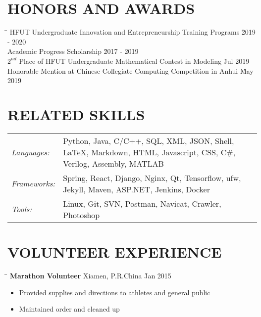 \documentclass{res}
\begin{document}
\begin{resume}
\vspace{-0.15in}	    
\section{HONORS AND AWARDS}  
    \vspace{-0.1in}	
    \begin{tabbing}
    \hspace{5in}\= \kill %
    HFUT Undergraduate Innovation and Entrepreneurship Training Programs \` 2019 - 2020 \\
    Academic Progress Scholarship \` 2017 - 2019  \\
    $2^{nd}$ Place of HFUT Undergraduate Mathematical Contest in Modeling \` Jul 2019 \\
    Honorable Mention at Chinese Collegiate Computing Competition in Anhui \` May 2019 
    \end{tabbing}\vspace{-20pt}      %
   
\vspace{+0.05in}	
\section{RELATED SKILLS}  
    \vspace{+0.05in}	 
    \begin{tabular}{l p{4.6in}}
    {\sl Languages:} & Python, Java, C/C++, SQL, XML, JSON, Shell,
                       LaTeX, Markdown, HTML, Javascript, CSS, C\#, 
                       Verilog, Assembly, MATLAB \\ 
                       
    {\sl Frameworks:} & Spring, React, Django, Nginx, Qt, Tensorflow, 
                        ufw, Jekyll, Maven, ASP.NET, Jenkins, Docker \\ 
    {\sl Tools:}  &  Linux, Git, SVN, Postman, Navicat, Crawler, Photoshop
    \end{tabular}   

\vspace{-0.12in}	
\section{VOLUNTEER EXPERIENCE}
    \vspace{-0.1in}
    \begin{tabbing}
    \hspace{2.3in}\= \hspace{2.6in}\= \kill %
    {\bf Marathon Volunteer} \> Xiamen, P.R.China     \` Jan 2015\\
    \end{tabbing}\vspace{-20pt}      %
    \begin{itemize} \itemsep -2pt %
    \item Provided supplies and directions to athletes and general public
    \item Maintained order and cleaned up
    \end{itemize}


\end{resume}
\end{document}
